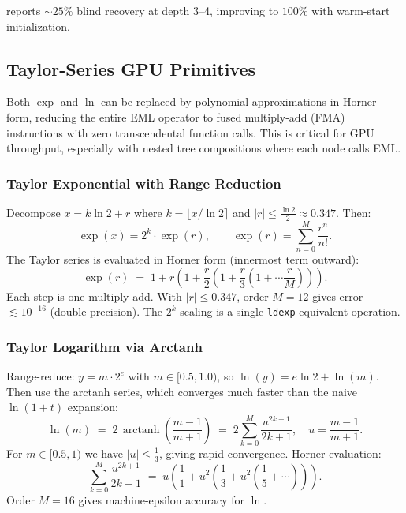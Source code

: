 \documentclass[11pt]{article}
\begin{document}
\noindent
\citet{odrzywołek2026} reports ${\sim}25\%$ blind recovery at depth 3--4,
improving to $100\%$ with warm-start initialization.


\subsection{Taylor-Series GPU Primitives}
\label{sec:taylor}

Both $\exp$ and $\ln$ can be replaced by polynomial approximations in Horner form,
reducing the entire EML operator to fused multiply-add (FMA) instructions with zero
transcendental function calls.  This is critical for GPU throughput, especially with
nested tree compositions where each node calls EML.

\subsubsection{Taylor Exponential with Range Reduction}

Decompose $x = k \ln 2 + r$ where $k = \lfloor x / \ln 2 \rceil$ and
$|r| \le \frac{\ln 2}{2} \approx 0.347$.  Then:
\begin{equation}\label{eq:exp-range}
  \exp(x) = 2^k \cdot \exp(r), \qquad
  \exp(r) = \sum_{n=0}^{M} \frac{r^n}{n!}.
\end{equation}
The Taylor series is evaluated in Horner form (innermost term outward):
\begin{equation}\label{eq:exp-horner}
  \exp(r) \;=\; 1 + r\!\left(1 + \frac{r}{2}\!\left(1 + \frac{r}{3}\!\left(1
  + \cdots \frac{r}{M}\right)\!\right)\!\right).
\end{equation}
Each step is one multiply-add.  With $|r| \le 0.347$, order $M = 12$ gives error
$\lesssim 10^{-16}$ (double precision).  The $2^k$ scaling is a single
\texttt{ldexp}-equivalent operation.

\subsubsection{Taylor Logarithm via Arctanh}

Range-reduce: $y = m \cdot 2^e$ with $m \in [0.5, 1.0)$, so
$\ln(y) = e \ln 2 + \ln(m)$.  Then use the arctanh series, which converges much
faster than the naive $\ln(1+t)$ expansion:
\begin{equation}\label{eq:ln-arctanh}
  \ln(m) \;=\; 2\,\operatorname{arctanh}\!\left(\frac{m-1}{m+1}\right)
  \;=\; 2\sum_{k=0}^{M}\frac{u^{2k+1}}{2k+1}, \quad u = \frac{m-1}{m+1}.
\end{equation}
For $m \in [0.5, 1)$ we have $|u| \le \tfrac{1}{3}$, giving rapid convergence.
Horner evaluation:
\begin{equation}\label{eq:ln-horner}
  \sum_{k=0}^{M} \frac{u^{2k+1}}{2k+1} \;=\; u\!\left(\frac{1}{1} +
  u^2\!\left(\frac{1}{3} + u^2\!\left(\frac{1}{5} + \cdots\right)\!\right)\!\right).
\end{equation}
Order $M = 16$ gives machine-epsilon accuracy for $\ln$.
\end{document}
